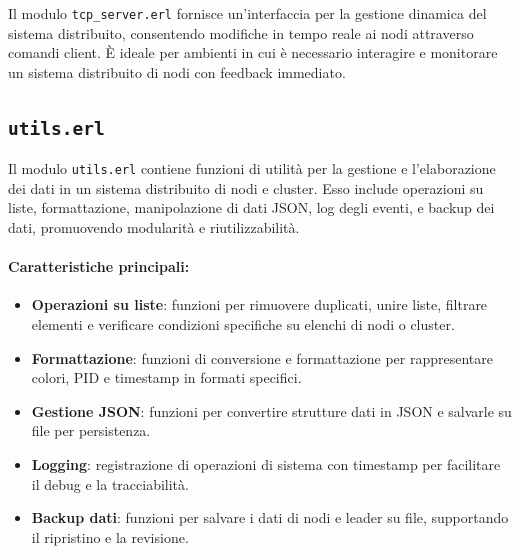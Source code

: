 \documentclass[12pt, a4paper]{report}
\begin{document}
\noindent
Il modulo \texttt{tcp\_server.erl} fornisce un'interfaccia per la gestione dinamica del sistema distribuito, consentendo modifiche in tempo reale ai nodi attraverso comandi client. \`E ideale per ambienti in cui \`e necessario interagire e monitorare un sistema distribuito di nodi con feedback immediato.

\subsection{\texttt{utils.erl}}

Il modulo \texttt{utils.erl} contiene funzioni di utilità per la gestione e l'elaborazione dei dati in un sistema distribuito di nodi e cluster. Esso include operazioni su liste, formattazione, manipolazione di dati JSON, log degli eventi, e backup dei dati, promuovendo modularità e riutilizzabilità.

\paragraph{Caratteristiche principali:}
\begin{itemize}
    \item \textbf{Operazioni su liste}: funzioni per rimuovere duplicati, unire liste, filtrare elementi e verificare condizioni specifiche su elenchi di nodi o cluster.
    \item \textbf{Formattazione}: funzioni di conversione e formattazione per rappresentare colori, PID e timestamp in formati specifici.
    \item \textbf{Gestione JSON}: funzioni per convertire strutture dati in JSON e salvarle su file per persistenza.
    \item \textbf{Logging}: registrazione di operazioni di sistema con timestamp per facilitare il debug e la tracciabilità.
    \item \textbf{Backup dati}: funzioni per salvare i dati di nodi e leader su file, supportando il ripristino e la revisione.
\end{itemize}
\end{document}
